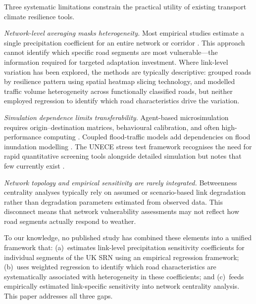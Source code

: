 \documentclass[review]{elsarticle}
\begin{document}
Three systematic limitations constrain the practical utility of existing transport climate resilience tools.

\textit{Network-level averaging masks heterogeneity.} Most empirical studies estimate a single precipitation coefficient for an entire network or corridor \citep{hranac2006empirical,koetse2009impact,bi2022weather}. This approach cannot identify which specific road segments are most vulnerable---the information required for targeted adaptation investment. Where link-level variation has been explored, the methods are typically descriptive: \citet{gao2024resilience} grouped roads by resilience pattern using spatial heatmap slicing technology, and \citet{pulugurtha2021aadt} modelled traffic volume heterogeneity across functionally classified roads, but neither employed regression to identify which road characteristics drive the variation.

\textit{Simulation dependence limits transferability.} Agent-based microsimulation requires origin--destination matrices, behavioural calibration, and often high-performance computing \citep{huang2022overview}. Coupled flood-traffic models add dependencies on flood inundation modelling \citep{pregnolato2017depth,pregnolato2016impact,he2026flood}. The UNECE stress test framework recognises the need for rapid quantitative screening tools alongside detailed simulation but notes that few currently exist \citep{unece2024stress}.

\textit{Network topology and empirical sensitivity are rarely integrated.} Betweenness centrality analyses typically rely on assumed or scenario-based link degradation \citep{wassmer2024resilience,stamos2023centrality} rather than degradation parameters estimated from observed data. This disconnect means that network vulnerability assessments may not reflect how road segments actually respond to weather.

To our knowledge, no published study has combined these elements into a unified framework that: (a)~estimates link-level precipitation sensitivity coefficients for individual segments of the UK SRN using an empirical regression framework; (b)~uses weighted regression to identify which road characteristics are systematically associated with heterogeneity in these coefficients; and (c)~feeds empirically estimated link-specific sensitivity into network centrality analysis. This paper addresses all three gaps.


\end{document}
